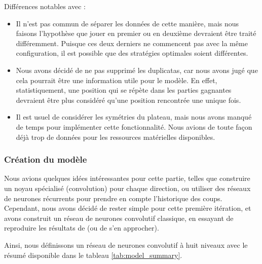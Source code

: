 Différences notables avec \cite{Liskowski_2018} :
\begin{itemize}
    \item Il n'est pas commun de séparer les données de cette manière, mais nous faisons l'hypothèse que jouer en premier ou en deuxième devraient être traité différemment. Puisque ces deux derniers ne commencent pas avec la même configuration, il est possible que des stratégies optimales soient différentes.
    \item Nous avons décidé de ne pas supprimé les duplicatas, car nous avons jugé que cela pourrait être une information utile pour le modèle. En effet, statistiquement, une position qui se répète dans les parties gagnantes devraient être plus considéré qu'une position rencontrée une unique fois.
    \item Il est usuel de considérer les symétries du plateau, mais nous avons manqué de temps pour implémenter cette fonctionnalité. Nous avions de toute façon déjà trop de données pour les ressources matérielles disponibles.
\end{itemize}

\subsubsection{Création du modèle}
\label{subsubsec:model}
Nous avions quelques idées intéressantes pour cette partie, telles que construire un noyau spécialisé (convolution) pour chaque direction, ou utiliser des réseaux de neurones récurrents pour prendre en compte l'historique des coups. Cependant, nous avons décidé de rester simple pour cette première itération, et avons construit un réseau de neurones convolutif classique, en essayant de reproduire les résultats de \cite{Liskowski_2018} (ou de s'en approcher).

Ainsi, nous définissons un réseau de neurones convolutif à huit niveaux avec le résumé disponible dans le tableau \ref{tab:model_summary}.

